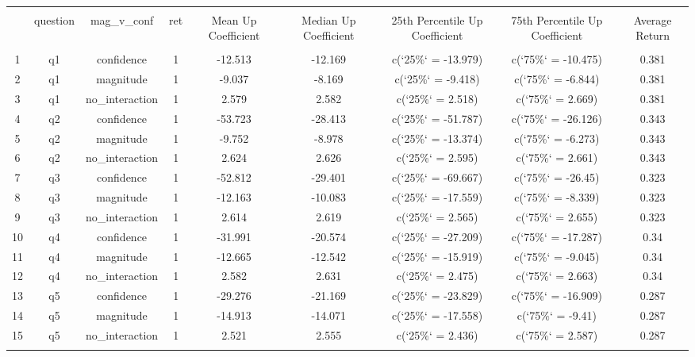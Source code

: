
\begin{table}[!htbp] \centering 
  \caption{} 
  \label{} 
\begin{tabular}{@{\extracolsep{5pt}} ccccccccc} 
\\[-1.8ex]\hline 
\hline \\[-1.8ex] 
 & question & mag\_v\_conf & ret & Mean Up Coefficient & Median Up Coefficient & 25th Percentile Up Coefficient & 75th Percentile Up Coefficient & Average Return \\ 
\hline \\[-1.8ex] 
1 & q1 & confidence & 1 & -12.513 & -12.169 & c(`25\%` = -13.979) & c(`75\%` = -10.475) & 0.381 \\ 
2 & q1 & magnitude & 1 & -9.037 & -8.169 & c(`25\%` = -9.418) & c(`75\%` = -6.844) & 0.381 \\ 
3 & q1 & no\_interaction & 1 & 2.579 & 2.582 & c(`25\%` = 2.518) & c(`75\%` = 2.669) & 0.381 \\ 
4 & q2 & confidence & 1 & -53.723 & -28.413 & c(`25\%` = -51.787) & c(`75\%` = -26.126) & 0.343 \\ 
5 & q2 & magnitude & 1 & -9.752 & -8.978 & c(`25\%` = -13.374) & c(`75\%` = -6.273) & 0.343 \\ 
6 & q2 & no\_interaction & 1 & 2.624 & 2.626 & c(`25\%` = 2.595) & c(`75\%` = 2.661) & 0.343 \\ 
7 & q3 & confidence & 1 & -52.812 & -29.401 & c(`25\%` = -69.667) & c(`75\%` = -26.45) & 0.323 \\ 
8 & q3 & magnitude & 1 & -12.163 & -10.083 & c(`25\%` = -17.559) & c(`75\%` = -8.339) & 0.323 \\ 
9 & q3 & no\_interaction & 1 & 2.614 & 2.619 & c(`25\%` = 2.565) & c(`75\%` = 2.655) & 0.323 \\ 
10 & q4 & confidence & 1 & -31.991 & -20.574 & c(`25\%` = -27.209) & c(`75\%` = -17.287) & 0.34 \\ 
11 & q4 & magnitude & 1 & -12.665 & -12.542 & c(`25\%` = -15.919) & c(`75\%` = -9.045) & 0.34 \\ 
12 & q4 & no\_interaction & 1 & 2.582 & 2.631 & c(`25\%` = 2.475) & c(`75\%` = 2.663) & 0.34 \\ 
13 & q5 & confidence & 1 & -29.276 & -21.169 & c(`25\%` = -23.829) & c(`75\%` = -16.909) & 0.287 \\ 
14 & q5 & magnitude & 1 & -14.913 & -14.071 & c(`25\%` = -17.558) & c(`75\%` = -9.41) & 0.287 \\ 
15 & q5 & no\_interaction & 1 & 2.521 & 2.555 & c(`25\%` = 2.436) & c(`75\%` = 2.587) & 0.287 \\ 
\hline \\[-1.8ex] 
\end{tabular} 
\end{table} 

